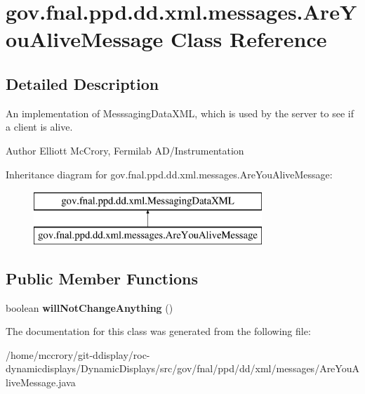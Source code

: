 \hypertarget{classgov_1_1fnal_1_1ppd_1_1dd_1_1xml_1_1messages_1_1AreYouAliveMessage}{\section{gov.\-fnal.\-ppd.\-dd.\-xml.\-messages.\-Are\-You\-Alive\-Message Class Reference}
\label{classgov_1_1fnal_1_1ppd_1_1dd_1_1xml_1_1messages_1_1AreYouAliveMessage}
}


\subsection{Detailed Description}
An implementation of Messsaging\-Data\-X\-M\-L, which is used by the server to see if a client is alive.

\begin{DoxyAuthor}{Author}
Elliott Mc\-Crory, Fermilab A\-D/\-Instrumentation 
\end{DoxyAuthor}
Inheritance diagram for gov.\-fnal.\-ppd.\-dd.\-xml.\-messages.\-Are\-You\-Alive\-Message\-:\begin{figure}[H]
\begin{center}
\leavevmode
\includegraphics[height=2.000000cm]{classgov_1_1fnal_1_1ppd_1_1dd_1_1xml_1_1messages_1_1AreYouAliveMessage}
\end{center}
\end{figure}
\subsection*{Public Member Functions}
\begin{DoxyCompactItemize}
\item 
\hypertarget{classgov_1_1fnal_1_1ppd_1_1dd_1_1xml_1_1messages_1_1AreYouAliveMessage_ad0e98dae9fd49f343fc3d8448f6af7e1}{boolean {\bfseries will\-Not\-Change\-Anything} ()}\label{classgov_1_1fnal_1_1ppd_1_1dd_1_1xml_1_1messages_1_1AreYouAliveMessage_ad0e98dae9fd49f343fc3d8448f6af7e1}

\end{DoxyCompactItemize}


The documentation for this class was generated from the following file\-:\begin{DoxyCompactItemize}
\item 
/home/mccrory/git-\/ddisplay/roc-\/dynamicdisplays/\-Dynamic\-Displays/src/gov/fnal/ppd/dd/xml/messages/Are\-You\-Alive\-Message.\-java\end{DoxyCompactItemize}
